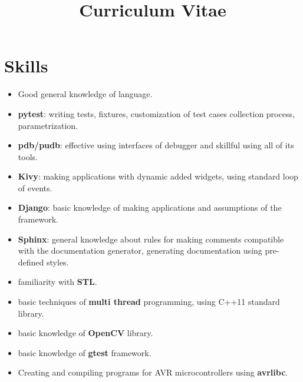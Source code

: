 \documentclass[11pt,a4paper,sans]{moderncv} %
\title{Curriculum Vitae}
\begin{document}
\makecvtitle %


\section{Skills}

 {
    \begin{itemize}
    \item Good general knowledge of language.
    \item \textbf{pytest}: writing tests, fixtures, customization of test cases collection process, parametrization.
    \item \textbf{pdb/pudb}: effective using interfaces of debugger and skillful using all of its tools.
    \item \textbf{Kivy}: making applications with dynamic added widgets, using standard loop of events.
    \item \textbf{Django}: basic knowledge of making applications and assumptions of the framework.
    \item \textbf{Sphinx}: general knowledge about rules for making comments compatible with the documentation generator, generating documentation using pre-defined styles.
    \end{itemize}
}
 {
    \begin{itemize}
    \item familiarity with \textbf{STL}.
    \item basic techniques of \textbf{multi thread} programming, using C++11 standard library.
    \item basic knowledge of \textbf{OpenCV} library.
    \item basic knowledge of \textbf{gtest} framework.
    \end{itemize}
}
 {\begin{itemize}
\item Creating and compiling programs for AVR microcontrollers using \textbf{avrlibc}.
\end{itemize}}
\end{document}
